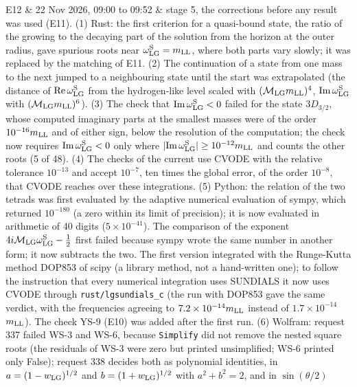 \documentclass[
  10pt,
]{article}
\begin{document}
\begin{longtable}[]
E12 & 22 Nov 2026, 09:00 to 09:52 & stage 5, the corrections before any
result was used (E11). (1) Rust: the first criterion for a quasi-bound
state, the ratio of the growing to the decaying part of the solution
from the horizon at the outer radius, gave spurious roots near
\(\omega^{\rm S}_{\rm LG}=m_{\rm LL}\), where both parts vary slowly; it
was replaced by the matching of E11. (2) The continuation of a state
from one mass to the next jumped to a neighbouring state until the start
was extrapolated (the distance of \({\rm Re}\,\omega^{\rm S}_{\rm LG}\)
from the hydrogen-like level scaled with
\((\mathcal M_{\rm LG}m_{\rm LL})^4\),
\({\rm Im}\,\omega^{\rm S}_{\rm LG}\) with
\((\mathcal M_{\rm LG}m_{\rm LL})^6\)). (3) The check that
\({\rm Im}\,\omega^{\rm S}_{\rm LG}<0\) failed for the state
\(3D_{3/2}\), whose computed imaginary parts at the smallest masses were
of the order \(10^{-16}m_{\rm LL}\) and of either sign, below the
resolution of the computation; the check now requires
\({\rm Im}\,\omega^{\rm S}_{\rm LG}<0\) only where
\(\lvert{\rm Im}\,\omega^{\rm S}_{\rm LG}\rvert\ge10^{-12}m_{\rm LL}\)
and counts the other roots (5 of 48). (4) The checks of the current use
CVODE with the relative tolerance \(10^{-13}\) and accept \(10^{-7}\),
ten times the global error, of the order \(10^{-8}\), that CVODE reaches
over these integrations. (5) Python: the relation of the two tetrads was
first evaluated by the adaptive numerical evaluation of sympy, which
returned \(10^{-180}\) (a zero within its limit of precision); it is now
evaluated in arithmetic of 40 digits (\(5\times10^{-41}\)). The
comparison of the exponent
\(4i\mathcal M_{\rm LG}\omega^{\rm S}_{\rm LG}-\tfrac12\) first failed
because sympy wrote the same number in another form; it now subtracts
the two. The first version integrated with the Runge-Kutta method DOP853
of scipy (a library method, not a hand-written one); to follow the
instruction that every numerical integration uses SUNDIALS it now uses
CVODE through \texttt{rust/lgsundials\_c} (the run with DOP853 gave the
same verdict, with the frequencies agreeing to
\(7.2\times10^{-14}m_{\rm LL}\) instead of \(1.7\times10^{-14}\)
\(m_{\rm LL}\)). The check YS-9 (E10) was added after the first run. (6)
Wolfram: request 337 failed WS-3 and WS-6, because \texttt{Simplify} did
not remove the nested square roots (the residuals of WS-3 were zero but
printed unsimplified; WS-6 printed only False); request 338 decides both
as polynomial identities, in \(a=(1-w_{\rm LG})^{1/2}\) and
\(b=(1+w_{\rm LG})^{1/2}\) with \(a^2+b^2=2\), and in \(\sin(\theta/2)\)

\end{longtable}
\end{document}
